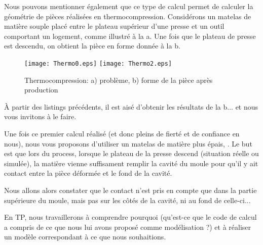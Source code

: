 \bigskip
Nous pouvons mentionner également que ce type de calcul permet de calculer la géométrie de
pièces réalisées en thermocompression.
Considérons un matelas de matière souple placé entre le plateau supérieur d'une presse et
un outil comportant un logement, comme illustré à la a.
Une fois que le plateau de presse est descendu, on obtient la pièce en forme donnée 
à la b.

\begin{figure}[ht]
  \center
  \texttt{[image: Thermo0.eps]} \hfill
  \texttt{[image: Thermo2.eps]}
  \caption{\label{Fig-Thermo} Thermocompression: a) problème, b) forme de la pièce après production}
\end{figure}

\medskip
À partir des listings précédents, il est aisé d'obtenir les résultats de la b...
et nous vous invitons à le faire.

\medskip
Une fois ce premier calcul réalisé (et donc pleins de fierté et de confiance en nous), nous vous proposons 
d'utiliser un matelas de matière plus épais, . 
Le but est que lors du process, lorsque le plateau de la presse descend (situation réelle ou simulée), 
la matière vienne suffisament remplir la cavité du moule pour qu'il y ait contact entre la pièce déformée 
et le fond de la cavité.

\bigskip
Nous allons alors constater que le contact n'est pris en compte que dans la partie supérieure du
moule, mais pas sur les côtés de la cavité, ni au fond de celle-ci...

En TP, nous travaillerons à comprendre pourquoi (qu'est-ce que le code de calcul a compris de ce 
que nous lui avons proposé comme modélisation ?) et à réaliser un modèle correspondant
à ce que nous souhaitions.
